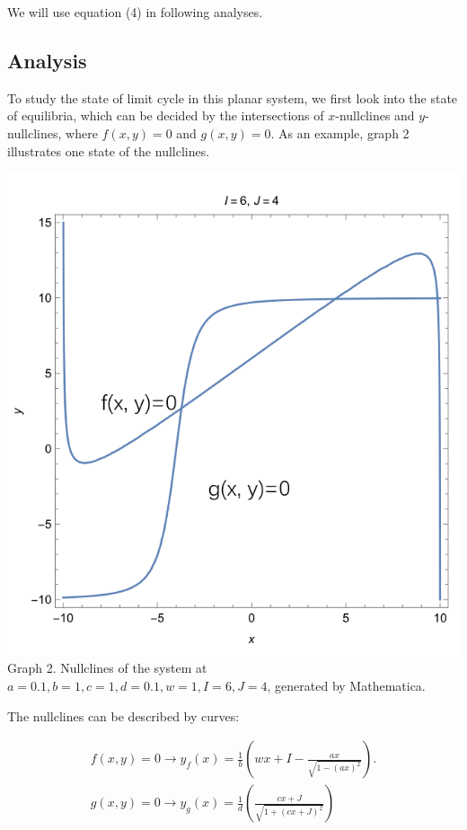 \documentclass[12pt]{article}
\begin{document}
We will use equation (4) in following analyses.

\subsection{Analysis}

\indent To study the state of limit cycle in this planar system, we first look into the state of equilibria, which can be decided by the intersections of $x$-nullclines and $y$-nullclines, where $f(x,y)=0$ and $g(x,y)=0$. As an example, graph 2 illustrates one state of the nullclines. 

\begin{center}
  \includegraphics[scale=0.4]{ Nullclines.png} 
  \\
  \footnotesize{Graph 2. Nullclines of the system at $a=0.1,b=1,c=1,d=0.1,w=1,I=6,J=4$, generated by Mathematica.}
\end{center}

\indent The nullclines can be described by curves:

\begin{equation}
  \begin{matrix}
    f(x,y)=0\to y_f(x)=\frac{1}{b}(wx+I-\frac{ax}{\sqrt{1-(ax)^2}}).
    \\
    g(x,y)=0\to y_g(x)=\frac{1}{d}(\frac{cx+J}{\sqrt{1+(cx+J)^2}})
  \end{matrix}
\end{equation}
\end{document}

